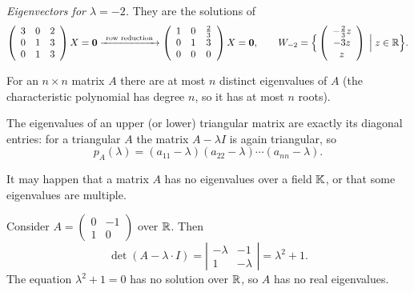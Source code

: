 \begin{example}
\noindent\emph{Eigenvectors for $\lambda = -2$.} They are the solutions of
\[
\left( \begin{array}{ccc} 3 & 0 & 2\\ 0 & 1 & 3\\ 0 & 1 & 3 \end{array} \right)X = \mathbf{0}
\xrightarrow{\ \text{row reduction}\ }
\left( \begin{array}{ccc} 1 & 0 & \tfrac{2}{3}\\ 0 & 1 & 3\\ 0 & 0 & 0 \end{array} \right)X = \mathbf{0},
\qquad
W_{-2} = \Big\{ \left( \begin{array}{c} -\tfrac{2}{3}z \\ -3z \\ z \end{array} \right) \;\Big|\; z\in \mathbb{R} \Big\}.
\]
\end{example}

\begin{fact}
For an $n\times n$ matrix $A$ there are at most $n$ distinct eigenvalues of $A$ (the characteristic
polynomial has degree $n$, so it has at most $n$ roots).
\end{fact}

\begin{fact}
The eigenvalues of an upper (or lower) triangular matrix are exactly its diagonal entries: for a triangular
$A$ the matrix $A-\lambda I$ is again triangular, so
\[
p_A(\lambda) = (a_{11}-\lambda)(a_{22}-\lambda)\cdots(a_{nn}-\lambda).
\]
\end{fact}

\begin{remark}
It may happen that a matrix $A$ has no eigenvalues over a field $\mathbb{K}$, or that some eigenvalues are multiple.
\end{remark}

\begin{example}
Consider $A = \left( \begin{smallmatrix} 0 & -1\\ 1 & 0 \end{smallmatrix} \right)$ over $\mathbb{R}$. Then
\[
\det(A-\lambda\cdot I) = \left| \begin{array}{cc} -\lambda & -1\\ 1 & -\lambda \end{array} \right| = \lambda^2 + 1.
\]
The equation $\lambda^2+1 = 0$ has no solution over $\mathbb{R}$, so $A$ has no real eigenvalues.
\end{example}

